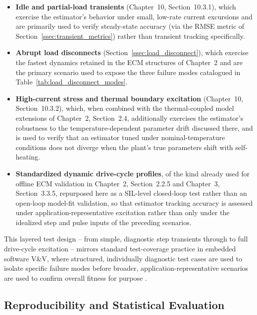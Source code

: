 \begin{itemize}
	\item \textbf{Idle and partial-load transients} (Chapter~10, Section~10.3.1), which exercise the estimator's behavior under small, low-rate current excursions and are primarily used to verify steady-state accuracy (via the RMSE metric of Section~\ref{ssec:transient_metrics}) rather than transient tracking specifically.
	\item \textbf{Abrupt load disconnects} (Section~\ref{ssec:load_disconnect}), which exercise the fastest dynamics retained in the ECM structures of Chapter~2 and are the primary scenario used to expose the three failure modes catalogued in Table~\ref{tab:load_disconnect_modes}.
	\item \textbf{High-current stress and thermal boundary excitation} (Chapter~10, Section~10.3.2), which, when combined with the thermal-coupled model extensions of Chapter~2, Section~2.4, additionally exercises the estimator's robustness to the temperature-dependent parameter drift discussed there, and is used to verify that an estimator tuned under nominal-temperature conditions does not diverge when the plant's true parameters shift with self-heating.
	\item \textbf{Standardized dynamic drive-cycle profiles}, of the kind already used for offline ECM validation in Chapter~2, Section~2.2.5 and Chapter~3, Section~3.3.5, repurposed here as a SIL-level closed-loop test rather than an open-loop model-fit validation, so that estimator tracking accuracy is assessed under application-representative excitation rather than only under the idealized step and pulse inputs of the preceding scenarios.
\end{itemize}

This layered test design -- from simple, diagnostic step transients through to full drive-cycle excitation -- mirrors standard test-coverage practice in embedded software V\&V, where structured, individually diagnostic test cases are used to isolate specific failure modes before broader, application-representative scenarios are used to confirm overall fitness for purpose \cite{empirical_mil_sil_arxiv}.

\subsection{Reproducibility and Statistical Evaluation}
\label{ssec:sil_reproducibility}

